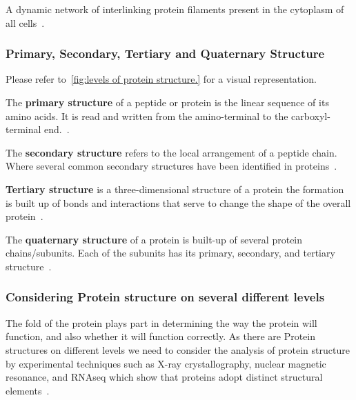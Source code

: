 \documentclass[]{final_report}
\begin{document}
\begin{definition}[Cytoskeleton]
    A dynamic network of interlinking protein filaments present in the cytoplasm of all cells~\cite{zvelebil_understanding_2008}. 
\end{definition}

\subsubsection{Primary, Secondary, Tertiary and Quaternary Structure}

Please refer to~\ref{fig:levels of protein structure.} for a visual representation.

The \textbf{primary structure} of a peptide or protein is the linear sequence of its amino acids. It is read and written from the amino-terminal to the carboxyl-terminal end.~\cite{sun_overview_2004}.

The \textbf{secondary structure} refers to the local arrangement of a peptide chain. Where several common secondary structures have been identified in proteins~\cite{sun_overview_2004}.

\textbf{Tertiary structure} is a three-dimensional structure of a protein the formation is built up of bonds and interactions that serve to change the shape of the overall protein~\cite{godbey_chapter_2022}.

The \textbf{quaternary structure} of a protein is built-up of several protein chains/subunits. Each of the subunits has its primary, secondary, and tertiary structure~\cite{ouellette_14_2015}.
\clearpage

\subsubsection{Considering Protein structure on several different levels}

The fold of the protein plays part in determining the way the protein will function, and also whether it will function correctly. As there are Protein structures on different levels we need to consider the analysis of protein structure by experimental techniques such as X-ray crystallography, nuclear magnetic resonance, and RNAseq which show that proteins adopt distinct structural elements~\cite{zvelebil_understanding_2008}.
\vspace{80px}
\end{document}
